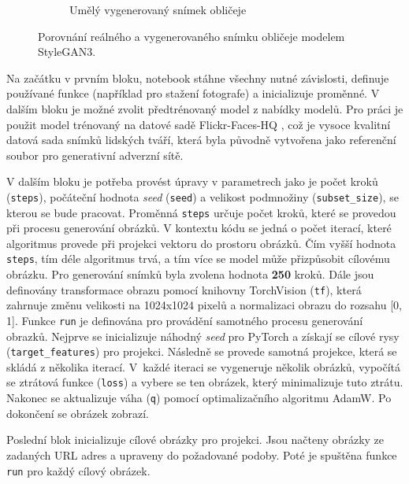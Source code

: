 \begin{figure}[H]
\begin{subfigure}{0.45\textwidth}
         \caption{Umělý vygenerovaný snímek obličeje}
         \label{fig:stylegan3-gen-image}
     \end{subfigure}
    \caption{Porovnání reálného a vygenerovaného snímku obličeje modelem StyleGAN3.}
    \label{fig:stylegan3-real-and-gen-image}
\end{figure}

\noindent Na začátku v prvním bloku, notebook stáhne všechny nutné závislosti, definuje používané funkce (například pro stažení fotografe) a inicializuje proměnné. V dalším bloku je možné zvolit předtrénovaný model z nabídky modelů. Pro práci je použit model trénovaný na datové sadě Flickr-Faces-HQ \cite{KarrasStyleGAN}, což je vysoce kvalitní datová sada snímků lidských tváří, která byla původně vytvořena jako referenční soubor pro generativní adverzní sítě.

V dalším bloku je potřeba provést úpravy v parametrech jako je počet kroků (\texttt{steps}), počáteční hodnota \textit{seed} (\texttt{seed}) a velikost podmnožiny (\texttt{subset\_size}), se kterou se bude pracovat. Proměnná \texttt{steps} určuje počet kroků, které se provedou při procesu generování obrázků. V kontextu kódu se jedná o počet iterací, které algoritmus provede při projekci vektoru do prostoru obrázků. Čím vyšší hodnota \texttt{steps}, tím déle algoritmus trvá, a tím více se model může přizpůsobit cílovému obrázku. Pro generování snímků byla zvolena hodnota \textbf{250} kroků. Dále jsou definovány transformace obrazu pomocí knihovny TorchVision (\texttt{tf}), která zahrnuje změnu velikosti na 1024x1024 pixelů a normalizaci obrazu do rozsahu [0, 1]. Funkce \texttt{run} je definována pro provádění samotného procesu generování obrazků. Nejprve se inicializuje náhodný \textit{seed} pro PyTorch a získají se cílové rysy (\texttt{target\_features}) pro projekci. Následně se provede samotná projekce, která se skládá z několika iterací. V~každé iteraci se vygeneruje několik obrázků, vypočítá se ztrátová funkce (\texttt{loss}) a vybere se ten obrázek, který minimalizuje tuto ztrátu. Nakonec se aktualizuje váha (\texttt{q}) pomocí optimalizačního algoritmu AdamW. Po dokončení se obrázek zobrazí.

Poslední blok inicializuje cílové obrázky pro projekci. Jsou načteny obrázky ze zadaných URL adres a upraveny do požadované podoby. Poté je spuštěna funkce \texttt{run} pro každý cílový obrázek.

